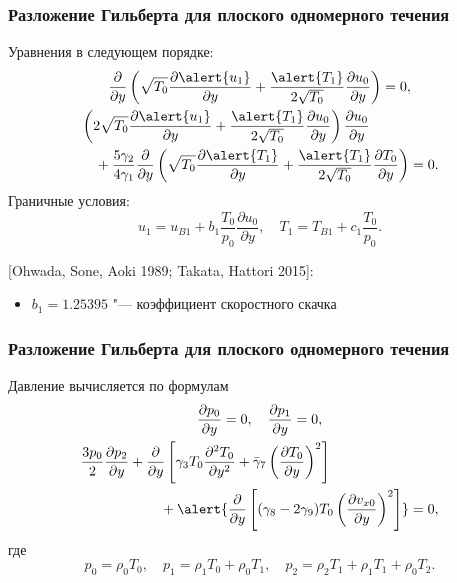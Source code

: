 \documentclass[mathserif]{beamer} %
\newcommand{\pder}[2][]{\frac{\partial#1}{\partial#2}}
\newcommand{\pderdual}[2][]{\frac{\partial^2#1}{\partial#2^2}}
\begin{document}
\begin{frame}
    \frametitle{Разложение Гильберта для плоского одномерного течения}
    Уравнения в следующем порядке:
    \begin{gather}
        \pder{y}\left( \sqrt{T_0}\pder[\alert{u_1}]{y} + \frac{\alert{T_1}}{2\sqrt{T_0}}\pder[u_0]{y} \right) = 0, \\
        \begin{multlined}[][9cm]
        \left( 2\sqrt{T_0}\pder[\alert{u_1}]{y} + \frac{\alert{T_1}}{2\sqrt{T_0}}\pder[u_0]{y} \right) \pder[u_0]{y} \\
            + \frac{5\gamma_2}{4\gamma_1} \pder{y}\left( \sqrt{T_0}\pder[\alert{T_1}]{y}
            + \frac{\alert{T_1}}{2\sqrt{T_0}}\pder[T_0]{y} \right) = 0.
        \end{multlined}
    \end{gather}
    Граничные условия:
    \begin{equation}
        u_1 = u_{B1} + b_1 \frac{T_0}{p_0} \pder[u_0]{y}, \quad
        T_1 = T_{B1} + c_1 \frac{T_0}{p_0}.
    \end{equation}

    [Ohwada, Sone, Aoki 1989; Takata, Hattori 2015]:
    \begin{itemize}
        \item \(b_1 = 1.25395\) "--- коэффициент скоростного скачка
    \end{itemize}
\end{frame}

\begin{frame}
    \frametitle{Разложение Гильберта для плоского одномерного течения}
    Давление вычисляется по формулам
    \begin{gather}
        \pder[p_0]{y} = 0, \quad \pder[p_1]{y} = 0, \label{eq:hilbert_p0_p1} \\
        \begin{multlined}[][9cm]
        \frac{3p_0}{2}\pder[p_2]{y}
            + \pder{y}\left[ \gamma_3 T_0 \pderdual[T_0]{y} + \bar{\gamma}_7\left(\pder[T_0]{y}\right)^2 \right] \\
            + \alert{\pder{y}\left[ (\gamma_8-2\gamma_9)T_0\left(\pder[v_{x0}]{y}\right)^2 \right]} = 0, \label{eq:hilbert_p2}
        \end{multlined}
    \end{gather}
    где
    \begin{equation}\label{eq:hilbert_expansion_p}
        p_0 = \rho_0 T_0, \quad
        p_1 = \rho_1 T_0 + \rho_0 T_1, \quad
        p_2 = \rho_2 T_1 + \rho_1 T_1 + \rho_0 T_2.
    \end{equation}
\end{frame}
\end{document}
